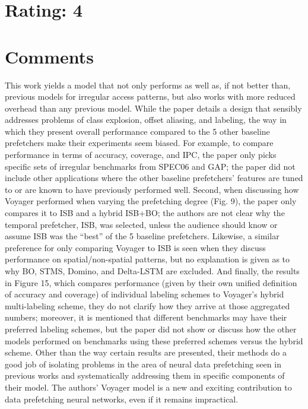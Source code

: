 \documentclass [12pt]{article}
\begin{document}
    \section{Rating: 4} %
    \label{sec:rating}

    \section{Comments} %
    \label{sec:comments}

        This work yields a model that not only performs as well as, if not better than, previous models for irregular access patterns, but also works with more reduced overhead than any previous model. While the paper details a design that sensibly addresses problems of class explosion, offset aliasing, and labeling, the way in which they present overall performance compared to the 5 other baseline prefetchers make their experiments seem biased. For example, to compare performance in terms of accuracy, coverage, and IPC, the paper only picks specific sets of irregular benchmarks from SPEC06 and GAP; the paper did not include other applications where the other baseline prefetchers' features are tuned to or are known to have previously performed well. Second, when discussing how Voyager performed when varying the prefetching degree (Fig. 9), the paper only compares it to ISB and a hybrid ISB+BO; the authors are not clear why the temporal prefetcher, ISB, was selected, unless the audience should know or assume ISB was the ``best'' of the 5 baseline prefetchers. Likewise, a similar preference for only comparing Voyager to ISB is seen when they discuss performance on spatial/non-spatial patterns, but no explanation is given as to why BO, STMS, Domino, and Delta-LSTM are excluded. And finally, the results in Figure 15, which compares performance (given by their own unified definition of accuracy and coverage) of individual labeling schemes to Voyager's hybrid multi-labeling scheme, they do not clarify how they arrive at those aggregated numbers; moreover, it is mentioned that different benchmarks may have their preferred labeling schemes, but the paper did not show or discuss how the other models performed on benchmarks using these preferred schemes versus the hybrid scheme. Other than the way certain results are presented, their methods do a good job of isolating problems in the area of neural data prefetching seen in previous works and systematically addressing them in specific components of their model. The authors' Voyager model is a new and exciting contribution to data prefetching neural networks, even if it remains impractical. 
        
\end{document}
